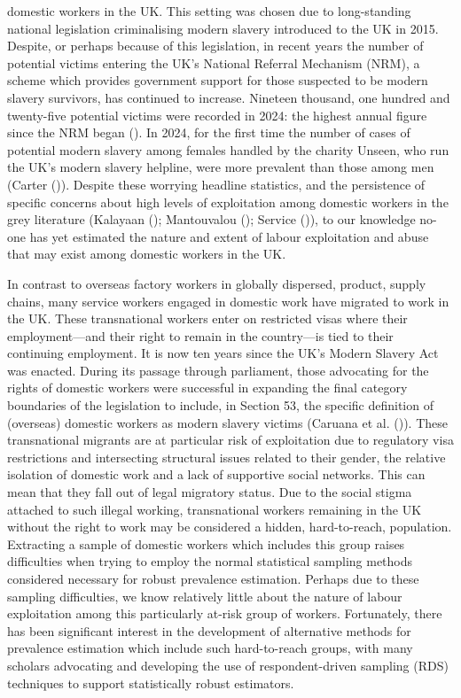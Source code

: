\documentclass[
  12pt,
]{article}
\theoremstyle{plain}
\theoremstyle{definition}
\begin{document}
domestic workers in the UK. This setting was chosen due to long-standing
national legislation criminalising modern slavery introduced to the UK
in 2015. Despite, or perhaps because of this legislation, in recent
years the number of potential victims entering the UK's National
Referral Mechanism (NRM), a scheme which provides government support for
those suspected to be modern slavery survivors, has continued to
increase. Nineteen thousand, one hundred and twenty-five potential
victims were recorded in 2024: the highest annual figure since the NRM
began (). In 2024,
for the first time the number of cases of potential modern slavery among
females handled by the charity Unseen, who run the UK's modern slavery
helpline, were more prevalent than those among men (Carter
()). Despite these worrying
headline statistics, and the persistence of specific concerns about high
levels of exploitation among domestic workers in the grey literature
(Kalayaan (); Mantouvalou
(); Service
()),
to our knowledge no-one has yet estimated the nature and extent of
labour exploitation and abuse that may exist among domestic workers in
the UK.

In contrast to overseas factory workers in globally dispersed, product,
supply chains, many service workers engaged in domestic work have
migrated to work in the UK. These transnational workers enter on
restricted visas where their employment---and their right to remain in
the country---is tied to their continuing employment. It is now ten
years since the UK's Modern Slavery Act was enacted. During its passage
through parliament, those advocating for the rights of domestic workers
were successful in expanding the final category boundaries of the
legislation to include, in Section 53, the specific definition of
(overseas) domestic workers as modern slavery victims (Caruana et al.
()). These transnational
migrants are at particular risk of exploitation due to regulatory visa
restrictions and intersecting structural issues related to their gender,
the relative isolation of domestic work and a lack of supportive social
networks. This can mean that they fall out of legal migratory status.
Due to the social stigma attached to such illegal working, transnational
workers remaining in the UK without the right to work may be considered
a hidden, hard-to-reach, population. Extracting a sample of domestic
workers which includes this group raises difficulties when trying to
employ the normal statistical sampling methods considered necessary for
robust prevalence estimation. Perhaps due to these sampling
difficulties, we know relatively little about the nature of labour
exploitation among this particularly at-risk group of workers.
Fortunately, there has been significant interest in the development of
alternative methods for prevalence estimation which include such
hard-to-reach groups, with many scholars advocating and developing the
use of respondent-driven sampling (RDS) techniques to support
statistically robust estimators.
\end{document}
